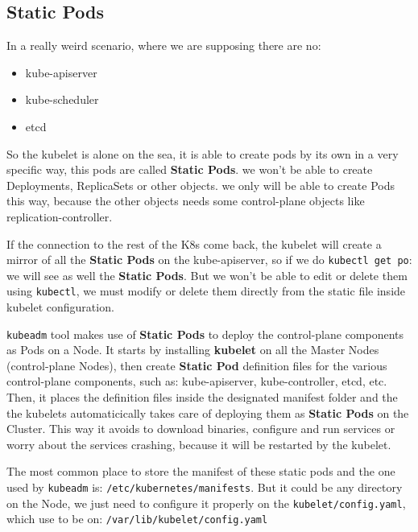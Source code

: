 \documentclass{article}
\begin{document}
\subsection{Static Pods}
In a really weird scenario, where we are supposing there are no:
\begin{itemize}
    \item kube-apiserver
    \item kube-scheduler
    \item etcd
\end{itemize}

So the kubelet is alone on the sea, it is able to create pods by its own in a very specific way, this pods are called \textbf{Static Pods}. we won't be able to create Deployments, ReplicaSets or other objects. we only will be able to create Pods this way, because the other objects needs some control-plane objects like replication-controller. 

If the connection to the rest of the K8s come back, the kubelet will create a mirror of all the \textbf{Static Pods} on the kube-apiserver, so if we do \verb|kubectl get po|: we will see as well the \textbf{Static Pods}. But we won't be able to edit or delete them using \verb|kubectl|, we must modify or delete them directly from the static file inside kubelet configuration.

\verb|kubeadm| tool makes use of \textbf{Static Pods} to deploy the control-plane components as Pods on a Node. It starts by installing \textbf{kubelet} on all the Master Nodes (control-plane Nodes), then create \textbf{Static Pod} definition files for the various control-plane components, such as: kube-apiserver, kube-controller, etcd, etc.
Then, it places the definition files inside the designated manifest folder and the the kubelets automaticically takes care of deploying
them as \textbf{Static Pods} on the Cluster. This way it avoids to download binaries, configure and run services or worry about the services crashing,
because it will be restarted by the kubelet.

The most common place to store the manifest of these static pods and the one used by \verb|kubeadm| is: \verb|/etc/kubernetes/manifests|. But it could be any directory on the Node, we just need to configure it properly on the \verb|kubelet/config.yaml|, which use to be on: \verb|/var/lib/kubelet/config.yaml|
\end{document}
